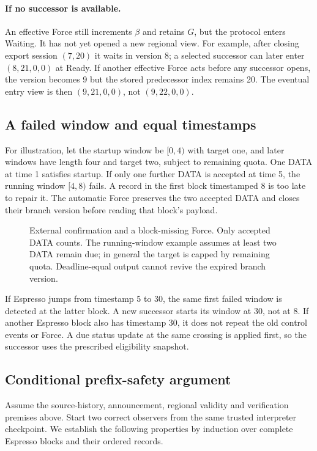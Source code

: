 \documentclass[11pt,a4paper]{article}
\newcounter{protocol}
\begin{document}
\paragraph{If no successor is available.}
An effective Force still increments $\beta$ and retains $G$, but the
protocol enters Waiting. It has not yet opened a new regional view.
For example, after closing export session $(7,20)$ it waits in version
8; a selected successor can later enter $(8,21,0,0)$ at Ready.
If another effective Force acts before any successor opens, the version
becomes 9 but the stored predecessor index remains 20. The eventual
entry view is then $(9,21,0,0)$, not $(9,22,0,0)$.

\subsection{A failed window and equal timestamps}
\label{sec:window-example}
For illustration, let the startup window be $[0,4)$ with target one,
and later windows have length four and target two, subject to remaining
quota. One DATA at time 1 satisfies startup. If only one further DATA
is accepted at time 5, the running window $[4,8)$ fails.
A record in the first block timestamped 8 is too late to repair it.
The automatic Force preserves the two accepted DATA and closes their
branch version before reading that block's payload.

\begin{figure}[htbp]\centering

\caption{External confirmation and a block-missing Force. Only accepted
DATA counts. The running-window example assumes at least two DATA
remain due; in general the target is capped by remaining quota.
Deadline-equal output cannot revive the expired branch version.}
\label{fig:observer-finality}
\end{figure}
\FloatBarrier

If Espresso jumps from timestamp 5 to 30, the same first failed window
is detected at the latter block. A new successor starts its window at
30, not at 8. If another Espresso block also has timestamp 30, it does
not repeat the old control events or Force. A due status update at the
same crossing is applied first, so the successor uses the prescribed
eligibility snapshot.

\subsection{Conditional prefix-safety argument}
\label{sec:safety-argument}
Assume the source-history, announcement, regional validity and
verification premises above. Start two correct observers from the same
trusted interpreter checkpoint. We establish the following properties
by induction over complete Espresso blocks and their ordered records.
\end{document}
